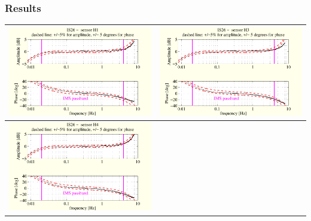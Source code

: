 \documentclass[handout,10pt]{beamer}
\begin{document}
\begin{frame}
\frametitle{Results}
\begin{tabular}{c||c}
\includegraphics[scale=0.35]{3monthsonIS26SUTboxplot1withSensor.pdf}
&
\includegraphics[scale=0.35]{3monthsonIS26SUTboxplot3withSensor.pdf}
\\
\hline\hline
\includegraphics[scale=0.35]{3monthsonIS26SUTboxplot4withSensor.pdf}

\end{tabular}
\end{frame}
\end{document}
